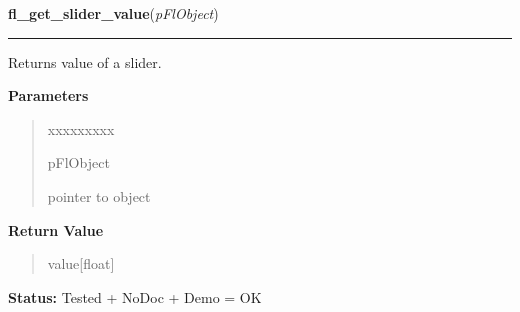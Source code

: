 \hspace{.8\funcindent}\begin{boxedminipage}{\funcwidth}

    \raggedright \textbf{fl\_get\_slider\_value}(\textit{pFlObject})

    \vspace{-1.5ex}

    \rule{\textwidth}{0.5\fboxrule}
\setlength{\parskip}{2ex}
    Returns value of a slider.

\setlength{\parskip}{1ex}
      \textbf{Parameters}
      \vspace{-1ex}

      \begin{quote}
        \begin{Ventry}{xxxxxxxxx}

          \item[pFlObject]

          pointer to object

        \end{Ventry}

      \end{quote}

      \textbf{Return Value}
    \vspace{-1ex}

      \begin{quote}
      value[float]

      \end{quote}

\textbf{Status:} Tested + NoDoc + Demo = OK



    \end{boxedminipage}

    \label{xformslib:flslider:fl_set_slider_bounds}

    \vspace{0.5ex}

